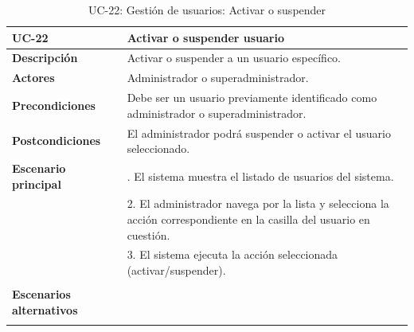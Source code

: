 \begin{table}[H]
  \begin{center}
    \begin{tabularx}{16.4cm}{|l|X|}
      \hline
      \textbf{UC-22} & \textbf{Activar o suspender usuario}\\
      \hline
      \textbf{Descripción} & Activar o suspender a un usuario específico.\\
      \hline
      \textbf{Actores} & Administrador o superadministrador.\\
      \hline
      \textbf{Precondiciones} & Debe ser un usuario previamente identificado como administrador o superadministrador.\\
      \hline
      \textbf{Postcondiciones} & El administrador podrá suspender o activar el usuario seleccionado.\\
      \hline
      \textbf{Escenario principal} & \smallskip 1. El sistema muestra el listado de usuarios del sistema.\\
      & 2. El administrador navega por la lista y selecciona la acción correspondiente en la casilla del usuario en cuestión.\\
      & 3. El sistema ejecuta la acción seleccionada (activar/suspender).\\
      & \\
      \hline
      \textbf{Escenarios alternativos} & \\
      & \\
      \hline
    \end{tabularx}
    \caption{UC-22: Gestión de usuarios: Activar o suspender}
    \label{tab:CU-activar-suspender-usuario}
  \end{center}
\end{table}


